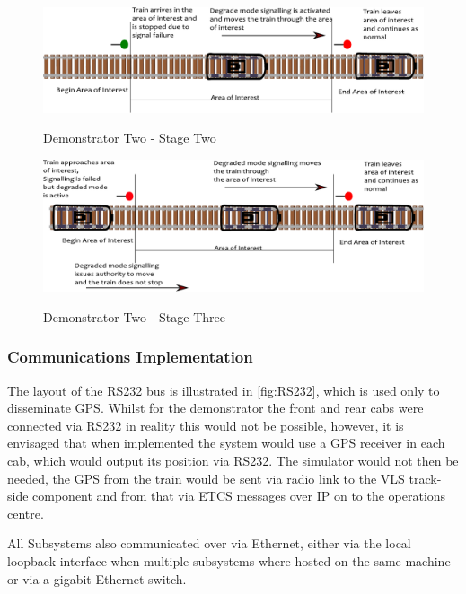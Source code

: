 \begin{figure}[H]
\myfloatalign
{\includegraphics[max height=\textheight,max width=\linewidth]{gfx/DemoTwo_StageTwo}} 
\caption{Demonstrator Two - Stage Two}
\label{fig:DemoTwo_S2}
\end{figure}

\begin{figure}[H]
\myfloatalign
{\includegraphics[max height=\textheight,max width=\linewidth]{gfx/DemoTwo_StageThree}} 
\caption{Demonstrator Two - Stage Three}
\label{fig:DemoTwo_S3}
\end{figure}

\subsubsection{Communications Implementation}

The layout of the RS232 bus is illustrated in \autoref{fig:RS232}, which is used only to disseminate GPS. Whilst for the demonstrator the front and rear cabs were connected via RS232 in reality this would not be possible, however, it is envisaged that when implemented the system would use a GPS receiver in each cab, which would output its position via RS232. The simulator would not then be needed, the GPS from the train would be sent via radio link to the VLS track-side component and from that via ETCS messages over IP on to the operations centre. 

All Subsystems also communicated over via Ethernet, either via the local loopback interface when multiple subsystems where hosted on the same machine or via a gigabit Ethernet switch. 

